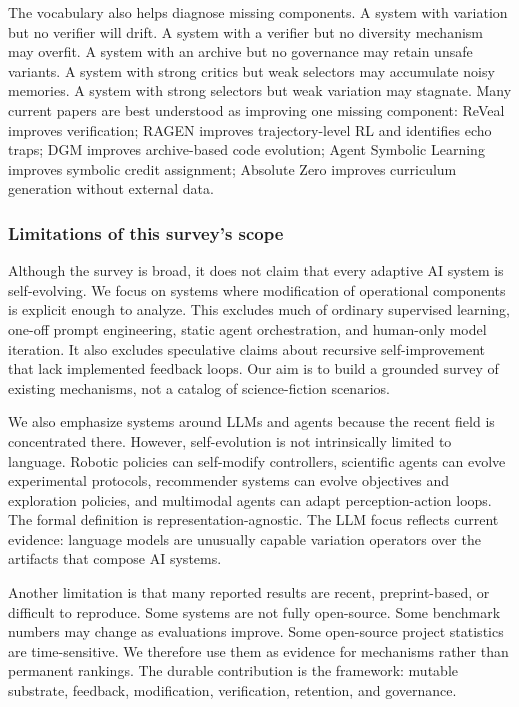 The vocabulary also helps diagnose missing components. A system with variation but no verifier will drift. A system with a verifier but no diversity mechanism may overfit. A system with an archive but no governance may retain unsafe variants. A system with strong critics but weak selectors may accumulate noisy memories. A system with strong selectors but weak variation may stagnate. Many current papers are best understood as improving one missing component: ReVeal improves verification; RAGEN improves trajectory-level RL and identifies echo traps; DGM improves archive-based code evolution; Agent Symbolic Learning improves symbolic credit assignment; Absolute Zero improves curriculum generation without external data.

\subsubsection{Limitations of this survey's scope}

Although the survey is broad, it does not claim that every adaptive AI system is self-evolving. We focus on systems where modification of operational components is explicit enough to analyze. This excludes much of ordinary supervised learning, one-off prompt engineering, static agent orchestration, and human-only model iteration. It also excludes speculative claims about recursive self-improvement that lack implemented feedback loops. Our aim is to build a grounded survey of existing mechanisms, not a catalog of science-fiction scenarios.

We also emphasize systems around LLMs and agents because the recent field is concentrated there. However, self-evolution is not intrinsically limited to language. Robotic policies can self-modify controllers, scientific agents can evolve experimental protocols, recommender systems can evolve objectives and exploration policies, and multimodal agents can adapt perception-action loops. The formal definition is representation-agnostic. The LLM focus reflects current evidence: language models are unusually capable variation operators over the artifacts that compose AI systems.

Another limitation is that many reported results are recent, preprint-based, or difficult to reproduce. Some systems are not fully open-source. Some benchmark numbers may change as evaluations improve. Some open-source project statistics are time-sensitive. We therefore use them as evidence for mechanisms rather than permanent rankings. The durable contribution is the framework: mutable substrate, feedback, modification, verification, retention, and governance.

